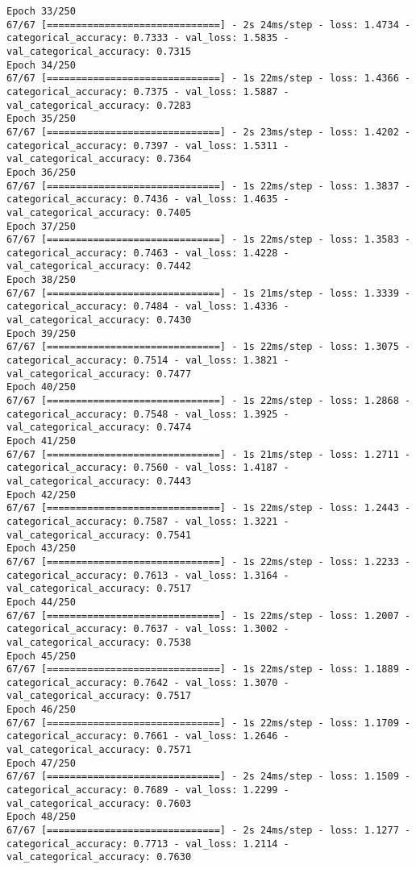 \begin{lstlisting}
Epoch 33/250
67/67 [==============================] - 2s 24ms/step - loss: 1.4734 - categorical_accuracy: 0.7333 - val_loss: 1.5835 - val_categorical_accuracy: 0.7315
Epoch 34/250
67/67 [==============================] - 1s 22ms/step - loss: 1.4366 - categorical_accuracy: 0.7375 - val_loss: 1.5887 - val_categorical_accuracy: 0.7283
Epoch 35/250
67/67 [==============================] - 2s 23ms/step - loss: 1.4202 - categorical_accuracy: 0.7397 - val_loss: 1.5311 - val_categorical_accuracy: 0.7364
Epoch 36/250
67/67 [==============================] - 1s 22ms/step - loss: 1.3837 - categorical_accuracy: 0.7436 - val_loss: 1.4635 - val_categorical_accuracy: 0.7405
Epoch 37/250
67/67 [==============================] - 1s 22ms/step - loss: 1.3583 - categorical_accuracy: 0.7463 - val_loss: 1.4228 - val_categorical_accuracy: 0.7442
Epoch 38/250
67/67 [==============================] - 1s 21ms/step - loss: 1.3339 - categorical_accuracy: 0.7484 - val_loss: 1.4336 - val_categorical_accuracy: 0.7430
Epoch 39/250
67/67 [==============================] - 1s 22ms/step - loss: 1.3075 - categorical_accuracy: 0.7514 - val_loss: 1.3821 - val_categorical_accuracy: 0.7477
Epoch 40/250
67/67 [==============================] - 1s 22ms/step - loss: 1.2868 - categorical_accuracy: 0.7548 - val_loss: 1.3925 - val_categorical_accuracy: 0.7474
Epoch 41/250
67/67 [==============================] - 1s 21ms/step - loss: 1.2711 - categorical_accuracy: 0.7560 - val_loss: 1.4187 - val_categorical_accuracy: 0.7443
Epoch 42/250
67/67 [==============================] - 1s 22ms/step - loss: 1.2443 - categorical_accuracy: 0.7587 - val_loss: 1.3221 - val_categorical_accuracy: 0.7541
Epoch 43/250
67/67 [==============================] - 1s 22ms/step - loss: 1.2233 - categorical_accuracy: 0.7613 - val_loss: 1.3164 - val_categorical_accuracy: 0.7517
Epoch 44/250
67/67 [==============================] - 1s 22ms/step - loss: 1.2007 - categorical_accuracy: 0.7637 - val_loss: 1.3002 - val_categorical_accuracy: 0.7538
Epoch 45/250
67/67 [==============================] - 1s 22ms/step - loss: 1.1889 - categorical_accuracy: 0.7642 - val_loss: 1.3070 - val_categorical_accuracy: 0.7517
Epoch 46/250
67/67 [==============================] - 1s 22ms/step - loss: 1.1709 - categorical_accuracy: 0.7661 - val_loss: 1.2646 - val_categorical_accuracy: 0.7571
Epoch 47/250
67/67 [==============================] - 2s 24ms/step - loss: 1.1509 - categorical_accuracy: 0.7689 - val_loss: 1.2299 - val_categorical_accuracy: 0.7603
Epoch 48/250
67/67 [==============================] - 2s 24ms/step - loss: 1.1277 - categorical_accuracy: 0.7713 - val_loss: 1.2114 - val_categorical_accuracy: 0.7630

\end{lstlisting}
